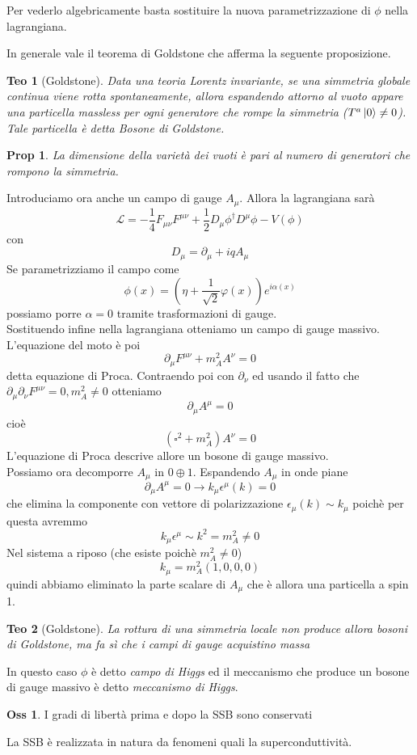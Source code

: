 \documentclass[10pt,a4paper]{article}
\newtheorem{thm}{Teo}[section]
\newtheorem{prop}{Prop}[section]
\theoremstyle{definition}
\newtheorem{observation}{Oss}[section]
\begin{document}
Per vederlo algebricamente basta sostituire la nuova parametrizzazione di $\phi$ nella lagrangiana.

In generale vale il teorema di Goldstone che afferma la seguente proposizione.

\begin{thm}[Goldstone]
    Data una teoria Lorentz invariante, se una simmetria globale continua viene rotta spontaneamente, allora espandendo attorno al vuoto appare una particella massless per ogni generatore che rompe la simmetria ($T^a\ket{0} \neq 0$). Tale particella è detta Bosone di Goldstone.
\end{thm}

\begin{prop}
    La dimensione della varietà dei vuoti è pari al numero di generatori che rompono la simmetria.
\end{prop}

Introduciamo ora anche un campo di gauge $A_\mu$. Allora la lagrangiana sarà
\[
\mathcal{L} = - \frac{1}{4} F_{\mu\nu}F^{\mu\nu} + \frac12 D_\mu\phi^\dagger D^\mu\phi - V(\phi)
\]
con 
\[
D_\mu = \partial_\mu + iqA_\mu    
\]
Se parametrizziamo il campo come 
\[
\phi(x) = (\eta + \frac{1}{\sqrt{2}} \varphi(x))e^{i\alpha(x)}    
\]
possiamo porre $\alpha = 0$ tramite trasformazioni di gauge.
\\
Sostituendo infine nella lagrangiana otteniamo un campo di gauge massivo.
\\
L'equazione del moto è poi 
\[
\partial_\mu F^{\mu\nu} + m_A^2 A^\nu = 0    
\]
detta equazione di Proca. Contraendo poi con $\partial_\nu$ ed usando il fatto che \(\partial_\mu \partial_\nu F^{\mu\nu} = 0, m^2_A \neq 0\) otteniamo
\[
\partial_\mu A^\mu = 0    
\]
cioè
\[
(\square^2 + m^2_A)A^\nu = 0    
\]
L'equazione di Proca descrive allore un bosone di gauge massivo.
\\
Possiamo ora decomporre $A_\mu$ in $0 \oplus 1$. Espandendo $A_\mu$ in onde piane 
\[
\partial_\mu A^\mu = 0 \longrightarrow k_\mu \epsilon^\mu(k) = 0    
\]
che elimina la componente con vettore di polarizzazione $\epsilon_\mu(k) \sim k_\mu$ poichè per questa avremmo
\[
k_\mu \epsilon^\mu  \sim k^2 = m^2_A \neq 0   
\]
Nel sistema a riposo (che esiste poichè $m^2_A \neq 0$)
\[
k_\mu = m^2_A (1, 0, 0, 0)    
\]
quindi abbiamo eliminato la parte scalare di $A_\mu$ che è allora una particella a spin 1.

\begin{thm}[Goldstone]
    La rottura di una simmetria locale non produce allora bosoni di Goldstone, ma fa sì che i campi di gauge acquistino massa 
\end{thm}
In questo caso $\phi$ è detto \textit{campo di Higgs} ed il meccanismo che produce un bosone di gauge massivo è detto \textit{meccanismo di Higgs}.
\begin{observation}
    I gradi di libertà prima e dopo la SSB sono conservati
\end{observation}
La SSB è realizzata in natura da fenomeni quali la superconduttività.
\end{document}
